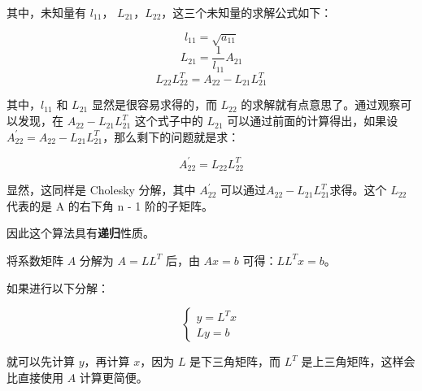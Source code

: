 其中，未知量有 \(l_{11}\)，
\(L_{21}\)，\(L_{22}\)，这三个未知量的求解公式如下：

\[ l_{11} = \sqrt{a_{11}} \]
\[ L_{21} = \frac{1}{l_{11}}A_{21} \]
\[ L_{22}L_{22}^T = A_{22} - L_{21}L_{21}^T \]

其中，\(l_{11}\) 和 \(L_{21}\) 显然是很容易求得的，而 \(L_{22}\)
的求解就有点意思了。通过观察可以发现，在 \(A_{22} - L_{21}L_{21}^T\)
这个式子中的 \(L_{21}\) 可以通过前面的计算得出，如果设
\(A_{22}^{'} = A_{22} - L_{21}L_{21}^T\)，那么剩下的问题就是求：

\[ A_{22}^{'} = L_{22}L_{22}^T \]

显然，这同样是 Cholesky 分解，其中 \(A_{22}^{'}\)
可以通过\(A_{22} - L_{21}L_{21}^T\)求得。这个 \(L_{22}\) 代表的是 A
的右下角 n - 1 阶的子矩阵。

因此这个算法具有\textbf{递归}性质。

将系数矩阵 \(A\) 分解为 \(A = L L^T\) 后，由 \(Ax = b\)
可得：\(LL^Tx = b\)。

如果进行以下分解：


\[
    \left\{\begin{matrix}
        y = L^Tx \\
        Ly = b
    \end{matrix}\right.
\]


就可以先计算 \(y\)，再计算 \(x\)，因为 \(L\) 是下三角矩阵，而 \(L^T\)
是上三角矩阵，这样会比直接使用 \(A\) 计算更简便。

\subsubsection{}
